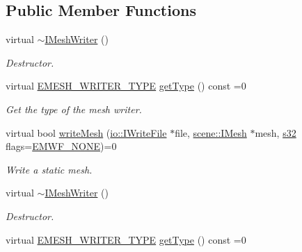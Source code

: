 \subsection*{Public Member Functions}
\begin{DoxyCompactItemize}
\item 
\mbox{\label{classirr_1_1scene_1_1IMeshWriter_a9f92ba59b4ea9a21ccc6bcddc0d3ada9}} 
virtual \hyperlink{classirr_1_1scene_1_1IMeshWriter_a9f92ba59b4ea9a21ccc6bcddc0d3ada9}{$\sim$\+I\+Mesh\+Writer} ()
\begin{DoxyCompactList}\small\item\em Destructor. \end{DoxyCompactList}\item 
virtual \hyperlink{namespaceirr_1_1scene_a431fa15741518ba15f6d5f2608b6cb4e}{E\+M\+E\+S\+H\+\_\+\+W\+R\+I\+T\+E\+R\+\_\+\+T\+Y\+PE} \hyperlink{classirr_1_1scene_1_1IMeshWriter_af70d702a86e25074f96e93a2d5a15813}{get\+Type} () const =0
\begin{DoxyCompactList}\small\item\em Get the type of the mesh writer. \end{DoxyCompactList}\item 
virtual bool \hyperlink{classirr_1_1scene_1_1IMeshWriter_a8cc31e211dc94104c7dd4b0ce4fd2cca}{write\+Mesh} (\hyperlink{classirr_1_1io_1_1IWriteFile}{io\+::\+I\+Write\+File} $\ast$file, \hyperlink{classirr_1_1scene_1_1IMesh}{scene\+::\+I\+Mesh} $\ast$mesh, \hyperlink{namespaceirr_ac66849b7a6ed16e30ebede579f9b47c6}{s32} flags=\hyperlink{namespaceirr_1_1scene_a9faae6cd9e415a0553cb4cdc190bbc1dac17214e9fb1a903dbe17812feff84656}{E\+M\+W\+F\+\_\+\+N\+O\+NE})=0
\begin{DoxyCompactList}\small\item\em Write a static mesh. \end{DoxyCompactList}\item 
\mbox{\label{classirr_1_1scene_1_1IMeshWriter_a9f92ba59b4ea9a21ccc6bcddc0d3ada9}} 
virtual \hyperlink{classirr_1_1scene_1_1IMeshWriter_a9f92ba59b4ea9a21ccc6bcddc0d3ada9}{$\sim$\+I\+Mesh\+Writer} ()
\begin{DoxyCompactList}\small\item\em Destructor. \end{DoxyCompactList}\item 
virtual \hyperlink{namespaceirr_1_1scene_a431fa15741518ba15f6d5f2608b6cb4e}{E\+M\+E\+S\+H\+\_\+\+W\+R\+I\+T\+E\+R\+\_\+\+T\+Y\+PE} \hyperlink{classirr_1_1scene_1_1IMeshWriter_af70d702a86e25074f96e93a2d5a15813}{get\+Type} () const =0

\end{DoxyCompactItemize}
